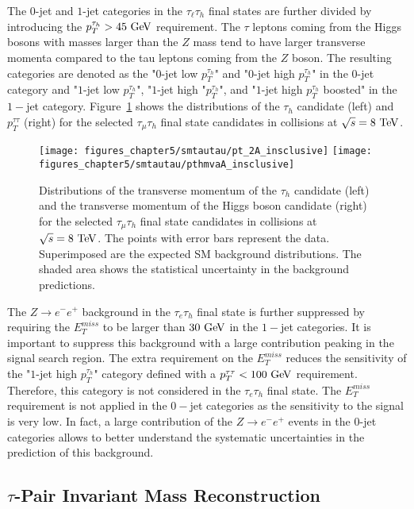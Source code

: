 The $0$-jet and $1$-jet categories in the $\tau_{\ell}\tau_{h}$ final states are further divided by introducing the $p_{T}^{\tau_h}>45~\mathrm{Ge\kern -0.1em V}$ requirement. The $\tau$ leptons coming from the Higgs bosons with masses larger than the $Z$ mass tend to have larger transverse momenta compared to the tau leptons coming from the $Z$ boson. The resulting categories are denoted as the "$0$-jet low $p_{T}^{\tau_h}$" and "$0$-jet high $p_{T}^{\tau_h}$" in the $0$-jet category and  "$1$-jet low $p_{T}^{\tau_h}$", "$1$-jet high "$p_{T}^{\tau_h}$", and "$1$-jet high $p_{T}^{\tau_h}$ boosted" in the $1-$jet category. Figure~\ref{fig:higgspt} shows the distributions of the $\tau_{h}$ candidate (left) and $p_{T}^{\tau\tau} $ (right) for the selected $\tau_{\mu}\tau_{h}$ final state candidates in collisions at $\sqrt{s}=8~\mathrm{Te\kern -0.1em V}$. 
\begin{figure}[htbp]
\centering
\texttt{[image: figures\_chapter5/smtautau/pt\_2A\_insclusive]}
\texttt{[image: figures\_chapter5/smtautau/pthmvaA\_insclusive]}
\caption{Distributions of the transverse momentum of the $\tau_{h}$ candidate (left)  and the transverse momentum of the Higgs boson candidate (right) for the selected $\tau_{\mu}\tau_{h}$ final state candidates in collisions at $\sqrt{s}=8~\mathrm{Te\kern -0.1em V}$. The points with error bars represent the data. Superimposed are the expected SM background distributions. The shaded area shows the statistical uncertainty in the background predictions.}
\label{fig:higgspt}
\end{figure}
The $Z\rightarrow e^{-}e^{+}$ background in the $\tau_{e}\tau_h$ final state is further suppressed by requiring the $E_{T}^{miss}$ to be larger than $30~\mathrm{Ge\kern -0.1em V}$ in the $1-$jet categories. It is important to suppress this background with a large contribution peaking in the signal search region. The extra requirement on the $E_{T}^{miss}$ reduces the sensitivity of the "$1$-jet high $p_{T}^{\tau_h}$" category defined with a $p_{T}^{\tau\tau}<100~\mathrm{Ge\kern -0.1em V}$ requirement. Therefore, this category is not considered in the $\tau_e\tau_h$ final state. The $E_{T}^{miss}$ requirement is not applied in the $0-$jet categories as the sensitivity to the signal is very low. In fact, a large contribution of the $Z\rightarrow e^{-}e^{+}$ events in the $0$-jet categories allows to better understand the systematic uncertainties in the prediction of this background. 

\subsection{$\tau$-Pair Invariant Mass Reconstruction}

